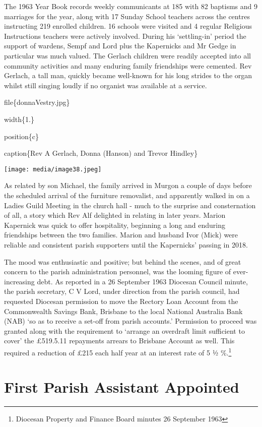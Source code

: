 The 1963 Year Book records weekly communicants at 185 with 82 baptisms and 9 marriages for the year, along with 17 Sunday School teachers across the centres instructing 219 enrolled children. 16 schools were visited and 4 regular Religious Instructions teachers were actively involved. During his `settling-in' period the support of wardens, Sempf and Lord plus the Kapernicks and Mr Gedge in particular was much valued. The Gerlach children were readily accepted into all community activities and many enduring family friendships were cemented. Rev Gerlach, a tall man, quickly became well-known for his long strides to the organ whilst still singing loudly if no organist was available at a service.

file\{donnaVestry.jpg\}

width\{1.\}

position\{c\}

caption\{Rev A Gerlach, Donna (Hanson) and Trevor Hindley\}

\texttt{[image: media/image38.jpeg]}

As related by son Michael, the family arrived in Murgon a couple of days before the scheduled arrival of the furniture removalist, and apparently walked in on a Ladies Guild Meeting in the church hall - much to the surprise and consternation of all, a story which Rev Alf delighted in relating in later years. Marion Kapernick was quick to offer hospitality, beginning a long and enduring friendships between the two families. Marion and husband Ivor (Mick) were reliable and consistent parish supporters until the Kapernicks' passing in 2018.

The mood was enthusiastic and positive; but behind the scenes, and of great concern to the parish administration personnel, was the looming figure of ever-increasing debt. As reported in a 26 September 1963 Diocesan Council minute, the parish secretary, C V Lord, under direction from the parish council, had requested Diocesan permission to move the Rectory Loan Account from the Commonwealth Savings Bank, Brisbane to the local National Australia Bank (NAB) `so as to receive a set-off from parish accounts.' Permission to proceed was granted along with the requirement to `arrange an overdraft limit sufficient to cover' the £519.5.11 repayments arrears to Brisbane Account as well. This required a reduction of £215 each half year at an interest rate of 5 ½ \%.\footnote{Diocesan Property and Finance Board minutes 26 September 1963}

\hypertarget{first-parish-assistant-appointed}{%
\section{First Parish Assistant Appointed}\label{first-parish-assistant-appointed}}

